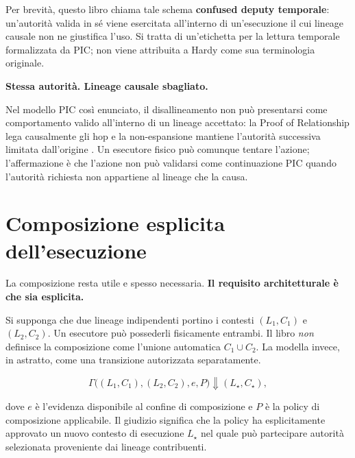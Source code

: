 \documentclass[10pt,oneside,openany]{book}
\newcommand{\term}[1]{\textbf{#1}}
\begin{document}
Per brevità, questo libro chiama tale schema \term{confused deputy temporale}: un'autorità valida in sé viene esercitata all'interno di un'esecuzione il cui lineage causale non ne giustifica l'uso. Si tratta di un'etichetta per la lettura temporale formalizzata da PIC; non viene attribuita a Hardy come sua terminologia originale.

\begin{center}
\sffamily\bfseries
Stessa autorità. Lineage causale sbagliato.
\end{center}

Nel modello PIC così enunciato, il disallineamento non può presentarsi come comportamento valido all'interno di un lineage accettato: la Proof of Relationship lega causalmente gli hop e la non-espansione mantiene l'autorità successiva limitata dall'origine \cite{gallo2026pic}. Un esecutore fisico può comunque tentare l'azione; l'affermazione è che l'azione non può validarsi come continuazione PIC quando l'autorità richiesta non appartiene al lineage che la causa.

\section{Composizione esplicita dell'esecuzione}
La composizione resta utile e spesso necessaria. \textbf{Il requisito architetturale è che sia esplicita.}

Si supponga che due lineage indipendenti portino i contesti $(L_1,C_1)$ e $(L_2,C_2)$. Un esecutore può possederli fisicamente entrambi. Il libro \emph{non} definisce la composizione come l'unione automatica $C_1\cup C_2$. La modella invece, in astratto, come una transizione autorizzata separatamente.
\begin{formulabox}
\[
\Gamma\bigl((L_1,C_1),(L_2,C_2),e,P\bigr) \Downarrow (L_\star,C_\star),
\]
\end{formulabox}
dove $e$ è l'evidenza disponibile al confine di composizione e $P$ è la policy di composizione applicabile. Il giudizio significa che la policy ha esplicitamente approvato un nuovo contesto di esecuzione $L_\star$ nel quale può partecipare autorità selezionata proveniente dai lineage contribuenti.
\end{document}
